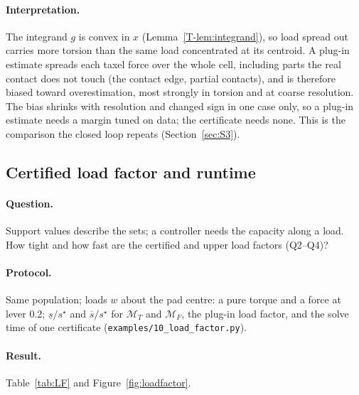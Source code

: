 \documentclass[11pt,a4paper]{article}
\newcommand{\M}{\mathcal M}
\newcommand{\T}[1]{\ref{T-#1}}                       %
\newcommand{\code}[1]{\texttt{#1}}
\begin{document}
\paragraph{Interpretation.} The integrand $g$ is convex in $x$ (Lemma~\T{lem:integrand}), so load spread out carries more torsion than the same
load concentrated at its centroid. A plug-in estimate spreads each taxel force over the whole cell, including parts the real contact does not
touch (the contact edge, partial contacts), and is therefore biased toward overestimation, most strongly in torsion and at coarse resolution.
The bias shrinks with resolution and changed sign in one case only, so a plug-in estimate needs a margin tuned on data; the
certificate needs none. This is the comparison the closed loop repeats (Section~\ref{sec:S3}).

\subsection{Certified load factor and runtime}
\label{sec:loadfactor}
\paragraph{Question.} Support values describe the sets; a controller needs the capacity along a load. How tight and how fast are the certified
and upper load factors (Q2--Q4)?
\paragraph{Protocol.} Same population; loads $w$ about the pad centre: a pure torque and a force at lever 0.2; $\underline s/s^\star$ and
$\overline s/s^\star$ for $\M_T$ and $\M_F$, the plug-in load factor, and the solve time of one certificate (\code{examples/10\_load\_factor.py}).
\paragraph{Result.} Table~\ref{tab:LF} and Figure~\ref{fig:loadfactor}.
\end{document}

